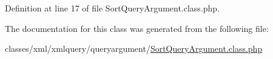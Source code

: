Definition at line 17 of file Sort\-Query\-Argument.\-class.\-php.



The documentation for this class was generated from the following file\-:\begin{DoxyCompactItemize}
\item 
classes/xml/xmlquery/queryargument/\hyperlink{SortQueryArgument_8class_8php}{Sort\-Query\-Argument.\-class.\-php}\end{DoxyCompactItemize}
